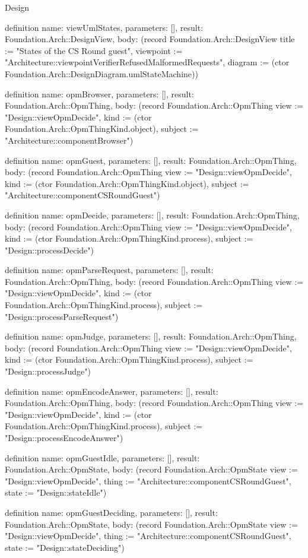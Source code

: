 \begin{lexlean}{Design}
\begin{semanticmodule}
definition{
  name: viewUmlStates,
  parameters: [],
  result: Foundation.Arch::DesignView,
  body: (record Foundation.Arch::DesignView {title := "States of the CS Round guest", viewpoint := "Architecture::viewpointVerifierRefusedMalformedRequests", diagram := (ctor Foundation.Arch::DesignDiagram.umlStateMachine)})
}

definition{
  name: opmBrowser,
  parameters: [],
  result: Foundation.Arch::OpmThing,
  body: (record Foundation.Arch::OpmThing {view := "Design::viewOpmDecide", kind := (ctor Foundation.Arch::OpmThingKind.object), subject := "Architecture::componentBrowser"})
}

definition{
  name: opmGuest,
  parameters: [],
  result: Foundation.Arch::OpmThing,
  body: (record Foundation.Arch::OpmThing {view := "Design::viewOpmDecide", kind := (ctor Foundation.Arch::OpmThingKind.object), subject := "Architecture::componentCSRoundGuest"})
}

definition{
  name: opmDecide,
  parameters: [],
  result: Foundation.Arch::OpmThing,
  body: (record Foundation.Arch::OpmThing {view := "Design::viewOpmDecide", kind := (ctor Foundation.Arch::OpmThingKind.process), subject := "Design::processDecide"})
}

definition{
  name: opmParseRequest,
  parameters: [],
  result: Foundation.Arch::OpmThing,
  body: (record Foundation.Arch::OpmThing {view := "Design::viewOpmDecide", kind := (ctor Foundation.Arch::OpmThingKind.process), subject := "Design::processParseRequest"})
}

definition{
  name: opmJudge,
  parameters: [],
  result: Foundation.Arch::OpmThing,
  body: (record Foundation.Arch::OpmThing {view := "Design::viewOpmDecide", kind := (ctor Foundation.Arch::OpmThingKind.process), subject := "Design::processJudge"})
}

definition{
  name: opmEncodeAnswer,
  parameters: [],
  result: Foundation.Arch::OpmThing,
  body: (record Foundation.Arch::OpmThing {view := "Design::viewOpmDecide", kind := (ctor Foundation.Arch::OpmThingKind.process), subject := "Design::processEncodeAnswer"})
}

definition{
  name: opmGuestIdle,
  parameters: [],
  result: Foundation.Arch::OpmState,
  body: (record Foundation.Arch::OpmState {view := "Design::viewOpmDecide", thing := "Architecture::componentCSRoundGuest", state := "Design::stateIdle"})
}

definition{
  name: opmGuestDeciding,
  parameters: [],
  result: Foundation.Arch::OpmState,
  body: (record Foundation.Arch::OpmState {view := "Design::viewOpmDecide", thing := "Architecture::componentCSRoundGuest", state := "Design::stateDeciding"})
}


\end{semanticmodule}
\end{lexlean}
